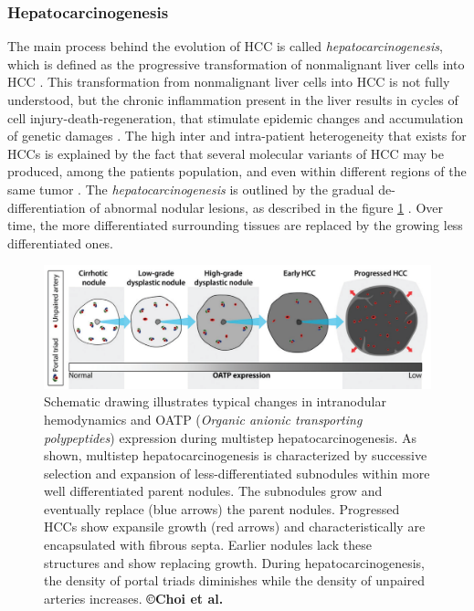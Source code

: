 \subsubsection{Hepatocarcinogenesis}\label{hepatocarcinogenesis}

The main process behind the evolution of HCC is called
\emph{hepatocarcinogenesis}, which is
defined as the progressive transformation of nonmalignant liver cells
into HCC \cite{Choi2014}. 
This transformation from nonmalignant liver cells into HCC is not
fully understood, but the chronic inflammation present in the liver
results in cycles of cell injury-death-regeneration, that stimulate
epidemic changes and accumulation of genetic damages \cite{Thorgeirsson2002,Aravalli2013,Brody2012,Trevisani2008a}. 
The high inter and intra-patient heterogeneity that exists for
HCCs is explained by the fact that several molecular variants of
HCC may be produced, among the patients population, and even
within different regions of the same tumor \cite{Trevisani2008a,Frenette2011}.
The \emph{hepatocarcinogenesis} is outlined by the gradual
de-differentiation of abnormal nodular lesions, as described in the
figure \ref{Choi2014_Fig1} \cite{Park2011,Frenette2011}. Over time, the more
differentiated surrounding tissues are replaced by the growing less
differentiated ones.

\begin{figure}[ht!]
\centering
\includegraphics[width=0.7\linewidth]{images/image4}
\caption{Schematic drawing illustrates typical changes in intranodular hemodynamics and OATP (\emph{Organic anionic
  transporting polypeptides}) expression during multistep hepatocarcinogenesis. As shown, multistep hepatocarcinogenesis is characterized by successive selection and expansion of less-differentiated subnodules within more well differentiated parent nodules. The subnodules grow and eventually replace (blue arrows) the parent nodules. Progressed HCCs show expansile growth (red arrows) and characteristically are encapsulated with fibrous septa. Earlier nodules lack these structures and show replacing growth. During hepatocarcinogenesis, the density of portal triads diminishes while the density of unpaired arteries increases. \textbf{©Choi et al. \cite{Choi2014}}}
\label{Choi2014_Fig1}
\end{figure}


